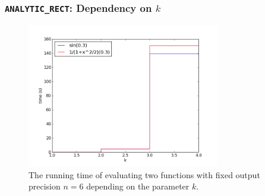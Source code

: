 \documentclass[xcolor=pdftex,dvipsnames,table]{beamer}
\newcommand{\code}[1]{\texttt{#1}}
\begin{document}
\begin{frame}
\frametitle{\code{ANALYTIC\_RECT}: Dependency on $k$}
\begin{figure}[h!]
\centering
\includegraphics[width=0.75\textwidth]{dep_on_k}
  \caption{The running time of evaluating two functions with fixed output precision $n=6$ depending on the parameter $k$.}
\end{figure}
\end{frame}
\end{document}
